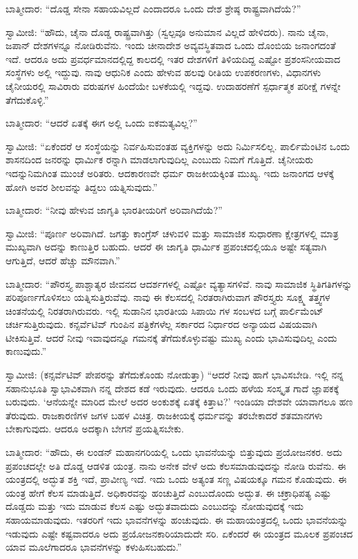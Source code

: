 ಬಾತ್ಮೀದಾರ: “ದೊಡ್ಡ ಸೇನಾ ಸಹಾಯವಿಲ್ಲದೆ ಎಂದಾದರೂ ಒಂದು ದೇಶ ಶ್ರೇಷ್ಠ ರಾಷ್ಟ್ರವಾಗಿದೆಯೆ?”

ಸ್ವಾಮೀಜಿ: “ಹೌದು, ಚೈನಾ ದೊಡ್ಡ ರಾಷ್ಟ್ರವಾಗಿತ್ತು (ಸ್ವಲ್ಪವೂ ಅನುಮಾನ ವಿಲ್ಲದೆ ಹೇಳಿದರು). ನಾನು ಚೈನಾ, ಜಪಾನ್​ ದೇಶಗಳನ್ನೂ ನೋಡಿರುವೆನು. ಇಂದು ಚೀನಾದೇಶ ಅವ್ಯವಸ್ಥಿತವಾದ ಒಂದು ದೊಂಬಿಯ ಜನಾಂಗದಂತೆ ಇದೆ. ಆದರೂ ಅದು ಪ್ರವರ್ಧಮಾನದಲ್ಲಿದ್ದ ಕಾಲದಲ್ಲಿ ಇತರ ದೇಶಗಳಿಗೆ ತಿಳಿಯದಿದ್ದ ಎಷ್ಟೋ ಪ್ರಶಂಸನೀಯವಾದ ಸಂಸ್ಥೆಗಳು ಅಲ್ಲಿ ಇದ್ದುವು. ನಾವು ಆಧುನಿಕ ಎಂದು ಹೇಳುವ ಹಲವು ರೀತಿಯ ಉಪಕರಣಗಳು, ವಿಧಾನಗಳು ಚೈನೀಯರಲ್ಲಿ ಸಾವಿರಾರು ವರುಷಗಳ ಹಿಂದೆಯೇ ಬಳಕೆಯಲ್ಲಿ ಇದ್ದವು. ಉದಾಹರಣೆಗೆ ಸ್ಪರ್ಧಾತ್ಮಕ ಪರೀಕ್ಷೆ ಗಳನ್ನೇ ತೆಗೆದುಕೊಳ್ಳಿ.”

ಬಾತ್ಮೀದಾರ: “ಆದರೆ ಏತಕ್ಕೆ ಈಗ ಅಲ್ಲಿ ಒಂದು ಐಕಮತ್ಯವಿಲ್ಲ?”

ಸ್ವಾಮೀಜಿ: “ಏಕೆಂದರೆ ಆ ಸಂಸ್ಥೆಯನ್ನು ನಿರ್ವಹಿಸುವಂತಹ ವ್ಯಕ್ತಿಗಳನ್ನು ಅದು ನಿರ್ಮಿಸಲಿಲ್ಲ. ಪಾರ್ಲಿಮೆಂಟಿನ ಒಂದು ಶಾಸನದಿಂದ ಜನರನ್ನು ಧಾರ್ಮಿಕ ರನ್ನಾಗಿ ಮಾಡಲಾಗುವುದಿಲ್ಲ ಎಂಬುದು ನಿಮಗೆ ಗೊತ್ತಿದೆ. ಚೈನೀಯರು ಇದನ್ನುನಿಮಗಿಂತ ಮುಂಚೆ ಅರಿತರು. ಆದಕಾರಣವೇ ಧರ್ಮ ರಾಜಕೀಯಕ್ಕಿಂತ ಮುಖ್ಯ. ಇದು ಜನಾಂಗದ ಆಳಕ್ಕೆ ಹೋಗಿ ಅವರ ಶೀಲವನ್ನು ತಿದ್ದಲು ಯತ್ನಿಸುವುದು.”

ಬಾತ್ಮೀದಾರ: “ನೀವು ಹೇಳುವ ಜಾಗೃತಿ ಭಾರತೀಯರಿಗೆ ಅರಿವಾಗಿದೆಯೆ?”

ಸ್ವಾಮೀಜಿ: “ಪೂರ್ಣ ಅರಿವಾಗಿದೆ. ಜಗತ್ತು ಕಾಂಗ್ರೆಸ್​ ಚಳುವಳಿ ಮತ್ತು ಸಾಮಾಜಿಕ ಸುಧಾರಣಾ ಕ್ಷೇತ್ರಗಳಲ್ಲಿ ಮಾತ್ರ ಮುಖ್ಯವಾಗಿ ಅದನ್ನು ಕಾಣುತ್ತಿರ ಬಹುದು. ಆದರೆ ಈ ಜಾಗೃತಿ ಧಾರ್ಮಿಕ ಪ್ರಪಂಚದಲ್ಲಿಯೂ ಅಷ್ಟೇ ಸತ್ಯವಾಗಿ ಆಗುತ್ತಿದೆ, ಆದರೆ ಹೆಚ್ಚು ಮೌನವಾಗಿ.”

ಬಾತ್ಮೀದಾರ: “ಪೌರಸ್ತ್ಯ ಪಾಶ್ಚಾತ್ಯರ ಜೀವನದ ಆದರ್ಶಗಳಲ್ಲಿ ಎಷ್ಟೋ ವ್ಯತ್ಯಾಸಗಳಿವೆ. ನಾವು ಸಾಮಾಜಿಕ ಸ್ಥಿತಿಗತಿಗಳನ್ನು ಪರಿಪೂರ್ಣಗೊಳಿಸಲು ಯತ್ನಿಸುತ್ತಿರುವೆವು. ನಾವು ಈ ಕೆಲಸದಲ್ಲಿ ನಿರತರಾಗಿರುವಾಗ ಪೌರಸ್ತ್ಯರು ಸೂಕ್ಷ್ಮ ತತ್ತ್ವಗಳ ಚಿಂತನೆಯಲ್ಲಿ ನಿರತರಾಗಿರುವರು. ಇಲ್ಲಿ ಸುಡಾನಿನ ಭಾರತೀಯ ಸಿಪಾಯಿ ಗಳ ಸಂಬಳದ ಬಗ್ಗೆ ಪಾರ್ಲಿಮೆಂಟ್​ ಚರ್ಚಿಸುತ್ತಿರುವುದು. ಕನ್ಸರ್ವೆಟಿವ್​ ಗುಂಪಿನ ಪತ್ರಿಕೆಗಳೆಲ್ಲ ಸರ್ಕಾರದ ನಿರ್ಧಾರದ ಅನ್ಯಾಯದ ವಿಷಯವಾಗಿ ಟೀಕಿಸುತ್ತಿವೆ. ಆದರೆ ನೀವು ಇವಾವುದನ್ನೂ ಗಮನಕ್ಕೆ ತೆಗೆದುಕೊಳ್ಳುವಷ್ಟು ಮುಖ್ಯ ಎಂದು ಭಾವಿಸುವುದಿಲ್ಲ ಎಂದು ಕಾಣುವುದು.”

ಸ್ವಾಮೀಜಿ: (ಕನ್ಸರ್ವೆಟಿವ್​ ಪೇಪರನ್ನು ತೆಗೆದುಕೊಂಡು ನೋಡುತ್ತಾ) “ಆದರೆ ನೀವು ಹಾಗೆ ಭಾವಿಸಬೇಡಿ. ಇಲ್ಲಿ ನನ್ನ ಸಹಾನುಭೂತಿ ಸ್ವಾಭಾವಿಕವಾಗಿ ನನ್ನ ದೇಶದ ಕಡೆ ಇರುವುದು. ಆದರೂ ಒಂದು ಹಳೆಯ ಸಂಸ್ಕೃತ ಗಾದೆ ಜ್ಞಾಪಕಕ್ಕೆ ಬರುವುದು. ‘ಆನೆಯನ್ನೇ ಮಾರಿದ ಮೇಲೆ ಅದರ ಅಂಕುಶಕ್ಕೆ ಏತಕ್ಕೆ ಕಿತ್ತಾಟ?’ ಇಂಡಿಯಾ ದೇಶವೇ ಯಾವಾಗಲೂ ಹಣ ತೆರುವುದು. ರಾಜಕಾರಣಿಗಳ ಜಗಳ ಬಹಳ ವಿಚಿತ್ರ. ರಾಜಕೀಯಕ್ಕೆ ಧರ್ಮವನ್ನು ತರಬೇಕಾದರೆ ಶತಮಾನಗಳು ಬೇಕಾಗುವುದು. ಆದರೂ ಅದಕ್ಕಾಗಿ ಬೇಗನೆ ಪ್ರಯತ್ನಿಸಬೇಕು.

ಬಾತ್ಮೀದಾರ: “ಹೌದು, ಈ ಲಂಡನ್​ ಮಹಾನಗರಿಯಲ್ಲಿ ಒಂದು ಭಾವನೆಯನ್ನು ಬಿತ್ತುವುದು ಪ್ರಯೋಜನಕರ. ಅದು ಪ್ರಪಂಚದಲ್ಲೇ ಅತಿ ದೊಡ್ಡ ಆಡಳಿತ ಯಂತ್ರ. ನಾನು ಅನೇಕ ವೇಳೆ ಅದು ಕೆಲಸಮಾಡುವುದನ್ನು ನೋಡಿ ರುವೆನು. ಈ ಯಂತ್ರದಲ್ಲಿ ಅದ್ಭುತ ಶಕ್ತಿ ಇದೆ, ಪ್ರಾವೀಣ್ಯ ಇದೆ. ಇದು ಒಂದು ಅತ್ಯಂತ ಸಣ್ಣ ವಿಷಯಕ್ಕೂ ಗಮನ ಕೊಡುವುದು. ಈ ಯಂತ್ರ ಹೇಗೆ ಕೆಲಸ ಮಾಡುತ್ತಿದೆ. ಅಧಿಕಾರವನ್ನು ಹಂಚುತ್ತಿದೆ ಎಂಬುದೊಂದು ಅದ್ಭುತ. ಈ ಚಕ್ರಾಧಿಪತ್ಯ ಎಷ್ಟು ದೊಡ್ಡದು ಮತ್ತು ಇದು ಮಾಡುವ ಕೆಲಸ ಎಷ್ಟು ಅದ್ಭುತವಾದುದು ಎಂಬುದನ್ನು ನೋಡುವುದಕ್ಕೆ ಇದು ಸಹಾಯಮಾಡುವುದು. ಇತರರಿಗೆ ಇದು ಭಾವನೆಗಳನ್ನು ಹಂಚುವುದು. ಈ ಮಹಾಯಂತ್ರದಲ್ಲಿ ಒಂದು ಭಾವನೆಯನ್ನು ಇಡುವುದು ಎಷ್ಟೇ ಕಷ್ಟವಾದರೂ ಅದು ಪ್ರಯೋಜನಕಾರಿಯಾದುದೇ ಸರಿ. ಏಕೆಂದರೆ ಈ ಯಂತ್ರದ ಮೂಲಕ ಪ್ರಪಂಚದ ಯಾವ ಮೂಲೆಗಾದರೂ ಭಾವನೆಗಳನ್ನು ಕಳುಹಿಸಬಹುದು.”

